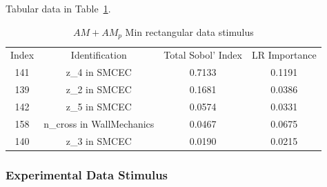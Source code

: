 \documentclass[12pt]{article}
\numberwithin{equation}{section}
\begin{document}
Tabular data in Table~\ref{qoi_AM_AMp_Min_rec}.

\begin{table}[h]
\centering
\begin{tabular}{cccc}
Index & Identification & Total Sobol' Index & LR Importance \\
141 & z\_4 in SMCEC & 0.7133 & 0.1191\\
139 &  z\_2 in SMCEC & 0.1681 & 0.0386\\
142 & z\_5 in SMCEC & 0.0574 & 0.0331\\
158 & n\_cross in WallMechanics & 0.0467 & 0.0675\\
140 & z\_3 in SMCEC & 0.0190 & 0.0215\\
\end{tabular}
\caption{$AM+AM_p$ Min rectangular data stimulus}
\label{qoi_AM_AMp_Min_rec}
\end{table}

\newpage

\subsubsection{Experimental Data Stimulus}
\end{document}
